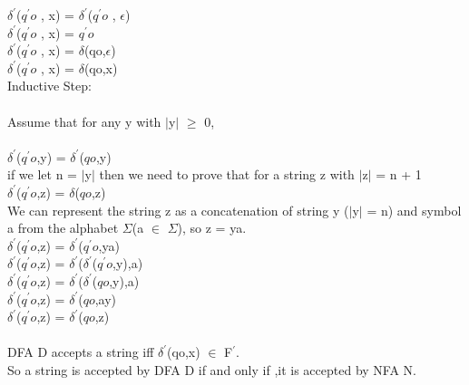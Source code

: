 \documentclass[a4paper]{exam}
\begin{document}
\begin{questions}
\begin{solution}
    $\delta^{'}$($q^{'}o$ , x) = $\delta^{'}$($q^{'}o$ , $\epsilon$) \\
    $\delta^{'}$($q^{'}o$ , x) = $q^{'}o$ \\
    $\delta^{'}$($q^{'}o$ , x) = $\delta$(qo,$\epsilon$) \\
    $\delta^{'}$($q^{'}o$ , x) = $\delta$(qo,x) \\
    
    Inductive Step: \\
    \\
    Assume that for any y with $\mid$y$\mid$ $\ge$ 0, \\
    \\
    $\delta^{'}$($q^{'}o$,y) = $\delta^{'}$($qo$,y) \\
    if we let n = $\mid$y$\mid$ then we need to prove that for a string z with $\mid$z$\mid$ = n + 1 \\
    $\delta^{'}$($q^{'}o$,z) = $\delta$($qo$,z) \\
    We can represent the string z as a concatenation of string y ($\mid$y$\mid$ = n) and symbol a from the alphabet $\Sigma$(a $\in$ $\Sigma$), so z = ya. \\
    $\delta^{'}$($q^{'}o$,z) = $\delta^{'}$($q^{'}o$,ya) \\
    $\delta^{'}$($q^{'}o$,z) = $\delta^{'}$($\delta^{'}$($q^{'}o$,y),a) \\
    $\delta^{'}$($q^{'}o$,z) = $\delta^{'}$($\delta^{'}$($qo$,y),a) \\
    $\delta^{'}$($q^{'}o$,z) = $\delta^{'}$($qo$,ay) \\
    $\delta^{'}$($q^{'}o$,z) = $\delta^{'}$($qo$,z) \\ \\
    DFA D accepts a string iff $\delta^{'}$(qo,x) $\in$ F$^{'}$. \\
    So a string is accepted by DFA D if and only if ,it is accepted by NFA N.



    
  \end{solution}
\end{questions}
\end{document}
